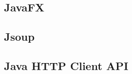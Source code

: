 % 

\subsection{JavaFX}
\label{subsec:0304-javafx}


\subsection{Jsoup}
\label{subsec:0304-jsoup}


\subsection{Java HTTP Client API}
\label{subsec:0304-java-http-client-api}
